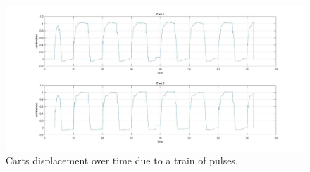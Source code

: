 \begin{figure}[h]
	\centering
	\includegraphics[width=0.9\linewidth]{img/hinf_response}
	\caption{Carts displacement over time due to a train of pulses.}
	\label{fig:2dofcarts}
\end{figure}

